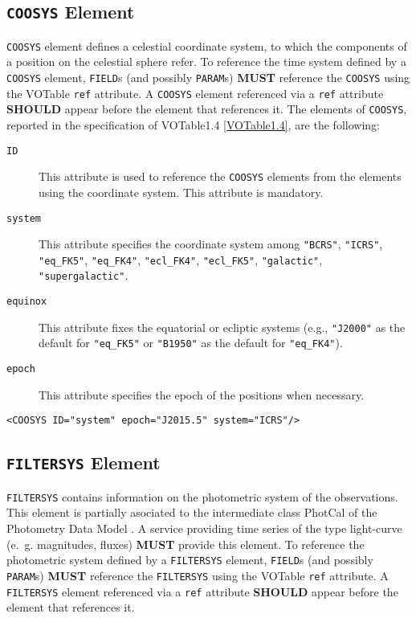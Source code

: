 \documentclass[11pt,a4paper]{ivoa}
\let\fg=\color
\def\attr#1{{\tt{\fg{DarkRed}#1}}}
\def\elem#1{{\tt{\fg{DarkRed}#1}}}
\begin{document}
\subsection{\elem{COOSYS} Element}
\elem{COOSYS} element defines a celestial coordinate system, to which the components of a position on the celestial sphere refer.
To reference the time system defined by a \elem{COOSYS} element, \elem{FIELD}s (and possibly \elem{PARAM}s) \textbf{MUST} reference the \elem{COOSYS} using the VOTable \attr{ref} attribute. A \elem{COOSYS} element referenced via a \attr{ref} attribute \textbf{SHOULD} appear before the element that references it. The elements of \elem{COOSYS}, reported in the specification of VOTable1.4 \ref{VOTable1.4}, are the following:
\begin{description}
     \item[\attr{ID}] This attribute is used to reference the \elem{COOSYS} elements from the elements using the coordinate system. This attribute is mandatory.
     \item[\attr{system}] This attribute specifies the coordinate system among \verb|"BCRS"|, \verb|"ICRS"|, \verb|"eq_FK5"|, \verb|"eq_FK4"|, \verb|"ecl_FK4"|, \verb|"ecl_FK5"|, \verb|"galactic"|, \verb|"supergalactic"|. 
     \item[\attr{equinox}] This attribute fixes the equatorial or ecliptic systems (e.g., \verb|"J2000"| as the default for \verb|"eq_FK5"| or \verb|"B1950"| as the default for \verb|"eq_FK4"|).
     \item[\attr{epoch}] This attribute specifies the epoch of the positions when necessary.
\end{description}

\noindent
\begingroup\footnotesize
\begin{tcolorbox}
\begin{verbatim}
<COOSYS ID="system" epoch="J2015.5" system="ICRS"/>
\end{verbatim}
\end{tcolorbox}
\endgroup

\subsection{\elem{FILTERSYS} Element}
\elem{FILTERSYS} contains information on the photometric system of the observations. This element is partially asociated to the intermediate class PhotCal of the Photometry Data Model \cite{PhotometryDM}. A service providing time series of the type light-curve (e.~g. magnitudes, fluxes) \textbf{MUST} provide this element. To reference the photometric system defined by a \elem{FILTERSYS} element, \elem{FIELD}s (and possibly \elem{PARAM}s) \textbf{MUST} reference the \elem{FILTERSYS} using the VOTable \attr{ref} attribute. A \elem{FILTERSYS} element referenced via a \attr{ref} attribute \textbf{SHOULD} appear before the element that references it. 
\end{document}
